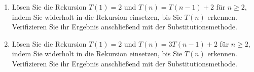\begin{exercise}
\phantom{}
  \begin{enumerate}[label = \alph*)]
  \item Lösen Sie die Rekursion $T(1) = 2$ und $T(n) = T(n-1) + 2$ für $n \geq 2$, indem Sie widerholt in die Rekursion einsetzen, bis Sie $T(n)$ erkennen. Verifizieren Sie ihr Ergebnis anschließend mit der Substitutionsmethode.

  \item Lösen Sie die Rekursion $T(1) = 2$ und $T(n) = 3T(n-1) + 2$ für $n \geq 2$, indem Sie widerholt in die Rekursion einsetzen, bis Sie $T(n)$ erkennen. Verifizieren Sie ihr Ergebnis anschließend mit der Substitutionsmethode.
  \end{enumerate}
\end{exercise}



